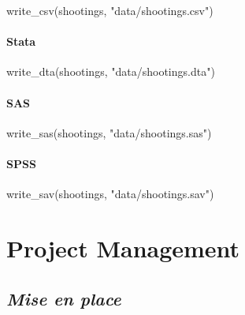 \documentclass[
]{krantz}
\makeatletter
\newenvironment{Shaded}{\begin{snugshade}}{\end{snugshade}}
\newcommand{\FunctionTok}[1]{\textcolor[rgb]{0,0,0}{#1}}
\newcommand{\NormalTok}[1]{#1}
\newcommand{\StringTok}[1]{\textcolor[rgb]{0.5,0.5,0.5}{#1}}
\newenvironment{kframe}{%
\medskip{}
\setlength{\fboxsep}{.8em}
 \def\at@end@of@kframe{}%
 \ifinner\ifhmode%
  \def\at@end@of@kframe{\end{minipage}}%
  \begin{minipage}{\columnwidth}%
 \fi\fi%
 \def\FrameCommand##1{\hskip\@totalleftmargin \hskip-\fboxsep
 \colorbox{shadecolor}{##1}\hskip-\fboxsep
     \hskip-\linewidth \hskip-\@totalleftmargin \hskip\columnwidth}%
 \MakeFramed {\advance\hsize-\width
   \@totalleftmargin\z@ \linewidth\hsize
   \@setminipage}}%
 {\par\unskip\endMakeFramed%
 \at@end@of@kframe}
\renewenvironment{Shaded}{\begin{kframe}}{\end{kframe}}
\makeatother
\begin{document}
\begin{Shaded}
\begin{Highlighting}[]
\FunctionTok{write\_csv}\NormalTok{(shootings, }\StringTok{"data/shootings.csv"}\NormalTok{)}
\end{Highlighting}
\end{Shaded}

\hypertarget{stata-1}{%
\subsection{Stata}\label{stata-1}}

\begin{Shaded}
\begin{Highlighting}[]
\FunctionTok{write\_dta}\NormalTok{(shootings, }\StringTok{"data/shootings.dta"}\NormalTok{)}
\end{Highlighting}
\end{Shaded}

\hypertarget{sas-1}{%
\subsection{SAS}\label{sas-1}}

\begin{Shaded}
\begin{Highlighting}[]
\FunctionTok{write\_sas}\NormalTok{(shootings, }\StringTok{"data/shootings.sas"}\NormalTok{)}
\end{Highlighting}
\end{Shaded}

\hypertarget{spss-1}{%
\subsection{SPSS}\label{spss-1}}

\begin{Shaded}
\begin{Highlighting}[]
\FunctionTok{write\_sav}\NormalTok{(shootings, }\StringTok{"data/shootings.sav"}\NormalTok{)}
\end{Highlighting}
\end{Shaded}

\hypertarget{part-project-management}{%
\part{Project
Management}\label{part-project-management}}

\hypertarget{mise-en-place}{%
\chapter{\texorpdfstring{\emph{Mise en
place}}{Mise en place}}\label{mise-en-place}}
\end{document}
